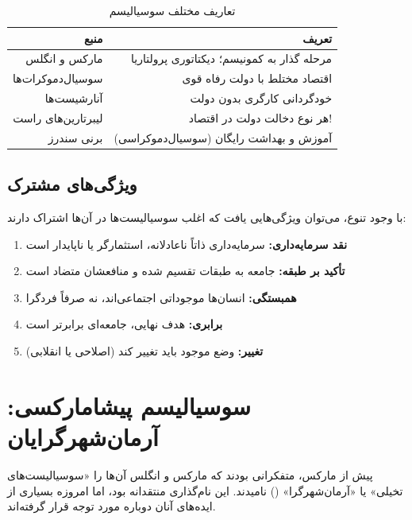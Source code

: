 \begin{table}[htbp]
\centering
\caption{تعاریف مختلف سوسیالیسم}
\label{tab:socialism-definitions}
\begin{tabular}{r|r}
\toprule
\textbf{منبع} & \textbf{تعریف} \\
\midrule
مارکس و انگلس & مرحله گذار به کمونیسم؛ دیکتاتوری پرولتاریا \\
\midrule
سوسیال‌دموکرات‌ها & اقتصاد مختلط با دولت رفاه قوی \\
\midrule
آنارشیست‌ها & خودگردانی کارگری بدون دولت \\
\midrule
لیبرتارین‌های راست & هر نوع دخالت دولت در اقتصاد! \\
\midrule
برنی سندرز & آموزش و بهداشت رایگان (سوسیال‌دموکراسی) \\
\bottomrule
\end{tabular}
\end{table}

\subsection{ویژگی‌های مشترک}

با وجود تنوع، می‌توان ویژگی‌هایی یافت که اغلب سوسیالیست‌ها در آن‌ها اشتراک دارند:

\begin{enumerate}[nosep, rightmargin=1.5cm]
    \item \textbf{نقد سرمایه‌داری:} سرمایه‌داری ذاتاً ناعادلانه، استثمارگر یا ناپایدار است
    \item \textbf{تأکید بر طبقه:} جامعه به طبقات تقسیم شده و منافعشان متضاد است
    \item \textbf{همبستگی:} انسان‌ها موجوداتی اجتماعی‌اند، نه صرفاً فردگرا
    \item \textbf{برابری:} هدف نهایی، جامعه‌ای برابرتر است
    \item \textbf{تغییر:} وضع موجود باید تغییر کند (اصلاحی یا انقلابی)
\end{enumerate}

\section{سوسیالیسم پیشامارکسی: آرمان‌شهرگرایان}

پیش از مارکس، متفکرانی بودند که مارکس و انگلس آن‌ها را «سوسیالیست‌های تخیلی» یا «آرمان‌شهرگرا» () نامیدند. این نام‌گذاری منتقدانه بود، اما امروزه بسیاری از ایده‌های آنان دوباره مورد توجه قرار گرفته‌اند.

